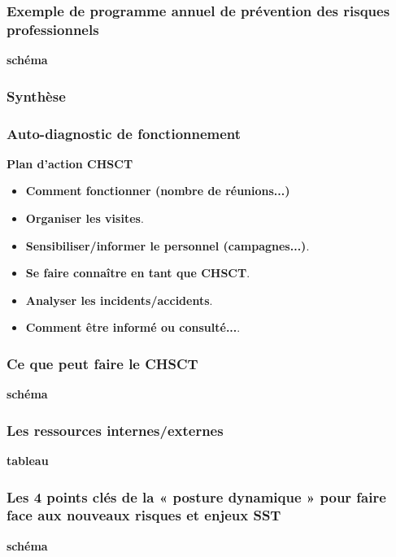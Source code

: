 \documentclass{beamer}
\begin{document}
\begin{frame}
\frametitle{Exemple de programme annuel de prévention des risques professionnels}

\textbf{schéma}
\end{frame}

\begin{frame}
\frametitle{Synthèse}

\end{frame}

\begin{frame}
\frametitle{Auto-diagnostic de fonctionnement}

\textbf{Plan d’action CHSCT}

\begin{itemize}
\item \textbf{Comment fonctionner (nombre de réunions...)}

\item \textbf{Organiser les visites}.

\item \textbf{Sensibiliser/informer le personnel (campagnes...)}.

\item \textbf{Se faire connaître en tant que CHSCT}.

\item \textbf{Analyser les incidents/accidents}.

\item \textbf{Comment être informé ou consulté...}.
\end{itemize}
\end{frame}

\begin{frame}
\frametitle{Ce que peut faire le CHSCT}

\textbf{schéma}
\end{frame}

\begin{frame}
\frametitle{Les ressources internes/externes}

\textbf{tableau}
\end{frame}

\begin{frame}
\frametitle{Les 4 points clés de la « posture dynamique » pour faire face aux nouveaux risques et enjeux SST}

\textbf{schéma}
\end{frame}
\end{document}
